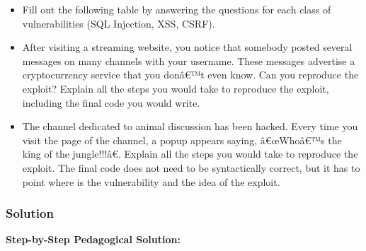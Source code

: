 \documentclass{article}
\begin{document}
\begin{itemize}
    \item[\textbf{1.}] [3 points] Fill out the following table by answering the questions for each class of vulnerabilities (SQL Injection, XSS, CSRF).
    \item[\textbf{2.}] [1.5 points] After visiting a streaming website, you notice that somebody posted several messages on many channels with your username. These messages advertise a cryptocurrency service that you donâ€™t even know. Can you reproduce the exploit? Explain all the steps you would take to reproduce the exploit, including the final code you would write.
    \item[\textbf{3.}] [1.5 points] The channel dedicated to animal discussion has been hacked. Every time you visit the page of the channel, a popup appears saying, â€œWhoâ€™s the king of the jungle!!!â€. Explain all the steps you would take to reproduce the exploit. The final code does not need to be syntactically correct, but it has to point where is the vulnerability and the idea of the exploit.
\end{itemize}

\subsubsection*{Solution}
\textbf{Step-by-Step Pedagogical Solution:}
\end{document}

